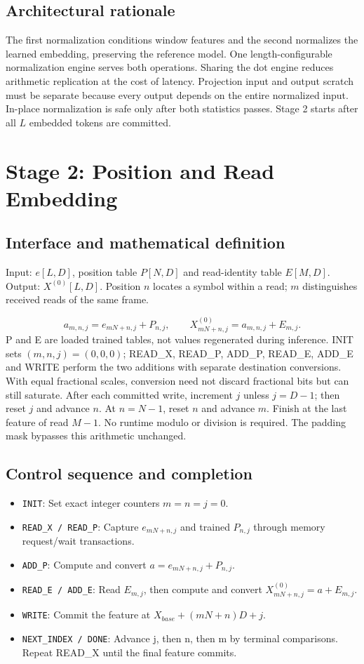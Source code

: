 \documentclass[11pt,a4paper]{article}
\begin{document}
\subsection{Architectural rationale}
The first normalization conditions window features and the second normalizes the learned embedding, preserving the reference model. One length-configurable normalization engine serves both operations. Sharing the dot engine reduces arithmetic replication at the cost of latency. Projection input and output scratch must be separate because every output depends on the entire normalized input. In-place normalization is safe only after both statistics passes. Stage 2 starts after all $L$ embedded tokens are committed.

\section{Stage 2: Position and Read Embedding}
\subsection{Interface and mathematical definition}
Input: $e[L,D]$, position table $P[N,D]$ and read-identity table $E[M,D]$. Output: $X^{(0)}[L,D]$. Position $n$ locates a symbol within a read; $m$ distinguishes received reads of the same frame.

\[
a_{m,n,j}=e_{mN+n,j}+P_{n,j},\qquad
X^{(0)}_{mN+n,j}=a_{m,n,j}+E_{m,j}.
\]
P and E are loaded trained tables, not values regenerated during inference. INIT sets $(m,n,j)=(0,0,0)$; READ\_X, READ\_P, ADD\_P, READ\_E, ADD\_E and WRITE perform the two additions with separate destination conversions. With equal fractional scales, conversion need not discard fractional bits but can still saturate.
After each committed write, increment $j$ unless $j=D-1$; then reset $j$ and advance $n$. At $n=N-1$, reset $n$ and advance $m$. Finish at the last feature of read $M-1$. No runtime modulo or division is required. The padding mask bypasses this arithmetic unchanged.

\subsection{Control sequence and completion}
\begin{itemize}
\item \texttt{INIT}: Set exact integer counters $m=n=j=0$.
\item \texttt{READ\_X / READ\_P}: Capture $e_{mN+n,j}$ and trained $P_{n,j}$ through memory request/wait transactions.
\item \texttt{ADD\_P}: Compute and convert $a=e_{mN+n,j}+P_{n,j}$.
\item \texttt{READ\_E / ADD\_E}: Read $E_{m,j}$, then compute and convert $X^{(0)}_{mN+n,j}=a+E_{m,j}$.
\item \texttt{WRITE}: Commit the feature at $X_{base}+(mN+n)D+j$.
\item \texttt{NEXT\_INDEX / DONE}: Advance j, then n, then m by terminal comparisons. Repeat READ_X until the final feature commits.
\end{itemize}
\end{document}
